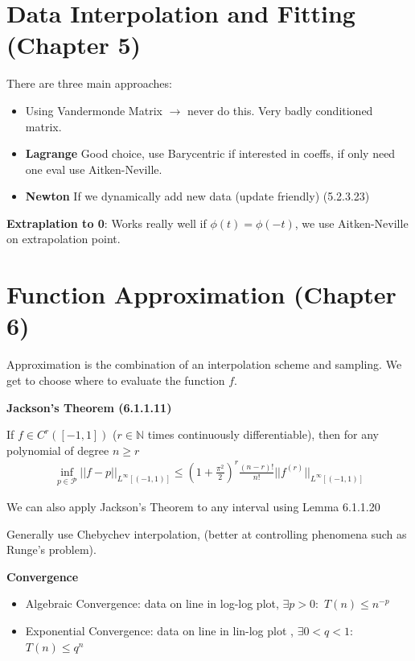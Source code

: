 \documentclass{sciposter}
\newenvironment{method}[1]{\begin{mdframed}[backgroundcolor=blue!10,innertopmargin=15pt, innerbottommargin=15pt, nobreak=true]
		\textbf{#1 }
	}
	{ 
	\end{mdframed}
}
\newcommand{\psection}[1]{\par \textbf{\large#1}}
\begin{document}
\begin{multicols}{2}
\section*{Data Interpolation and Fitting (Chapter 5)}


There are three main approaches:

\begin{itemize}
	\item Using Vandermonde Matrix $\rightarrow$ never do this. Very badly conditioned matrix.
	\item \textbf{Lagrange} Good choice, use Barycentric if interested in coeffs, if only need one eval use Aitken-Neville.
	\item \textbf{Newton} If we dynamically add new data (update friendly) (5.2.3.23)
\end{itemize}


\textbf{Extraplation to 0}: Works really well if $\phi(t) = \phi(-t)$, we use Aitken-Neville on extrapolation point.


\section*{Function Approximation (Chapter 6)}

Approximation is the combination of an interpolation scheme and sampling. We get to choose where to evaluate the function $f$.

\begin{method}{Jackson's Theorem (6.1.1.11)}
	If $f\in C^r([-1,1])$ ($r\in \mathbb{N}$ times continuously differentiable), then for any polynomial of degree $n \geq r$
	\begin{align*}
		\inf_{p \in \mathcal{P}} || f-p ||_{L^\infty [(-1,1)]} \leq (1 + \frac{\pi^2}{2})^r \frac{(n-r)!}{n!} || f^{(r)} ||_{L^\infty [(-1,1)]}
	\end{align*}
\end{method}

We can also apply Jackson's Theorem to any interval using Lemma 6.1.1.20

Generally use Chebychev interpolation, (better at controlling phenomena such as Runge's problem).


\psection{Convergence}


\begin{itemize}
\item Algebraic Convergence: data on line in log-log plot, $\exists p > 0:$  $T(n) \leq n^{-p}$

\item Exponential Convergence: data on line in lin-log plot , $\exists 0 < q < 1:$  $T(n) \leq q^n$


\end{itemize}
\end{multicols}
\end{document}
